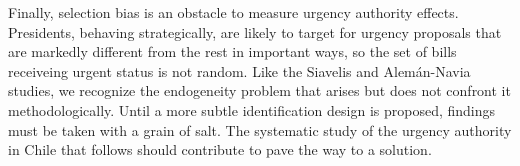 \documentclass[letter,12pt]{article}
\begin{document}

Finally, selection bias is an obstacle to measure urgency authority effects. Presidents, behaving strategically, are likely to target for urgency proposals that are markedly different from the rest in important ways, so the set of bills receiveing urgent status is not random. Like the Siavelis and Alem\'an-Navia studies, we recognize the endogeneity problem that arises but does not confront it methodologically. Until a more subtle identification design is proposed, findings must be taken with a grain of salt. The systematic study of the urgency authority in Chile that follows should contribute to pave the way to a solution. 


\end{document}
